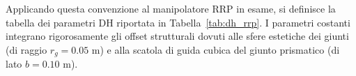 \documentclass[11pt, a4paper]{report}
\begin{document}
Applicando questa convenzione al manipolatore RRP in esame, si definisce la tabella dei parametri DH riportata in Tabella~\ref{tab:dh_rrp}. I parametri costanti integrano rigorosamente gli offset strutturali dovuti alle sfere estetiche dei giunti (di raggio \(r_{g} = 0.05\) m) e alla scatola di guida cubica del giunto prismatico (di lato \(b = 0.10\) m).

\begin{table}[htbp]
    \centering
    \caption{Parametri di Denavit-Hartenberg per il manipolatore RRP.}
    \label{tab:dh_rrp}
\end{table}
\end{document}
